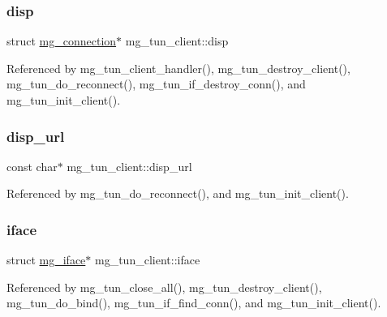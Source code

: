 \subsubsection{\texorpdfstring{disp}{disp}}
{\footnotesize\ttfamily struct \hyperlink{structmg__connection}{mg\+\_\+connection}$\ast$ mg\+\_\+tun\+\_\+client\+::disp}



Referenced by mg\+\_\+tun\+\_\+client\+\_\+handler(), mg\+\_\+tun\+\_\+destroy\+\_\+client(), mg\+\_\+tun\+\_\+do\+\_\+reconnect(), mg\+\_\+tun\+\_\+if\+\_\+destroy\+\_\+conn(), and mg\+\_\+tun\+\_\+init\+\_\+client().

\mbox{\label{structmg__tun__client_ae2702c91d02403ab47e96cfa00748171_ae2702c91d02403ab47e96cfa00748171}} 
\subsubsection{\texorpdfstring{disp\+\_\+url}{disp\_url}}
{\footnotesize\ttfamily const char$\ast$ mg\+\_\+tun\+\_\+client\+::disp\+\_\+url}



Referenced by mg\+\_\+tun\+\_\+do\+\_\+reconnect(), and mg\+\_\+tun\+\_\+init\+\_\+client().

\mbox{\label{structmg__tun__client_ad83d50edc28747fbaae7dc914a908e7f_ad83d50edc28747fbaae7dc914a908e7f}} 
\subsubsection{\texorpdfstring{iface}{iface}}
{\footnotesize\ttfamily struct \hyperlink{structmg__iface}{mg\+\_\+iface}$\ast$ mg\+\_\+tun\+\_\+client\+::iface}



Referenced by mg\+\_\+tun\+\_\+close\+\_\+all(), mg\+\_\+tun\+\_\+destroy\+\_\+client(), mg\+\_\+tun\+\_\+do\+\_\+bind(), mg\+\_\+tun\+\_\+if\+\_\+find\+\_\+conn(), and mg\+\_\+tun\+\_\+init\+\_\+client().

\mbox{\label{structmg__tun__client_a8f57544d695fdb0377020fe4288e2403_a8f57544d695fdb0377020fe4288e2403}} 
